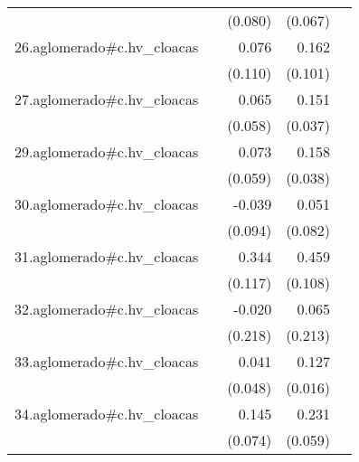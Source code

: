 {\begin{longtable}{l*{4}{D{.}{.}{-1}}}
            &                     &     (0.080)         &     (0.067)         &                     \\
\addlinespace
26.aglomerado#c.hv\_cloacas&                     &       0.076         &       0.162         &                     \\
            &                     &     (0.110)         &     (0.101)         &                     \\
\addlinespace
27.aglomerado#c.hv\_cloacas&                     &       0.065         &       0.151\sym{***}&                     \\
            &                     &     (0.058)         &     (0.037)         &                     \\
\addlinespace
29.aglomerado#c.hv\_cloacas&                     &       0.073         &       0.158\sym{***}&                     \\
            &                     &     (0.059)         &     (0.038)         &                     \\
\addlinespace
30.aglomerado#c.hv\_cloacas&                     &      -0.039         &       0.051         &                     \\
            &                     &     (0.094)         &     (0.082)         &                     \\
\addlinespace
31.aglomerado#c.hv\_cloacas&                     &       0.344\sym{**} &       0.459\sym{***}&                     \\
            &                     &     (0.117)         &     (0.108)         &                     \\
\addlinespace
32.aglomerado#c.hv\_cloacas&                     &      -0.020         &       0.065         &                     \\
            &                     &     (0.218)         &     (0.213)         &                     \\
\addlinespace
33.aglomerado#c.hv\_cloacas&                     &       0.041         &       0.127\sym{***}&                     \\
            &                     &     (0.048)         &     (0.016)         &                     \\
\addlinespace
34.aglomerado#c.hv\_cloacas&                     &       0.145         &       0.231\sym{***}&                     \\
            &                     &     (0.074)         &     (0.059)         &                     \\

\end{longtable}}
